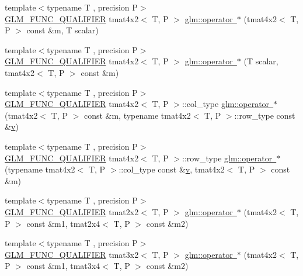 \begin{DoxyCompactItemize}
\item 
{\footnotesize template$<$typename T , precision P$>$ }\\\mbox{\hyperlink{setup_8hpp_a33fdea6f91c5f834105f7415e2a64407}{G\+L\+M\+\_\+\+F\+U\+N\+C\+\_\+\+Q\+U\+A\+L\+I\+F\+I\+ER}} tmat4x2$<$ T, P $>$ \mbox{\hyperlink{namespaceglm_a312fbcc303029e356741f9ebbd979899}{glm\+::operator $\ast$}} (tmat4x2$<$ T, P $>$ const \&m, T scalar)
\item 
{\footnotesize template$<$typename T , precision P$>$ }\\\mbox{\hyperlink{setup_8hpp_a33fdea6f91c5f834105f7415e2a64407}{G\+L\+M\+\_\+\+F\+U\+N\+C\+\_\+\+Q\+U\+A\+L\+I\+F\+I\+ER}} tmat4x2$<$ T, P $>$ \mbox{\hyperlink{namespaceglm_ae79f0b6ad6917a5a1a040a29983941f1}{glm\+::operator $\ast$}} (T scalar, tmat4x2$<$ T, P $>$ const \&m)
\item 
{\footnotesize template$<$typename T , precision P$>$ }\\\mbox{\hyperlink{setup_8hpp_a33fdea6f91c5f834105f7415e2a64407}{G\+L\+M\+\_\+\+F\+U\+N\+C\+\_\+\+Q\+U\+A\+L\+I\+F\+I\+ER}} tmat4x2$<$ T, P $>$\+::col\+\_\+type \mbox{\hyperlink{namespaceglm_ae9c993bec940fedbe4c463928c413cc4}{glm\+::operator $\ast$}} (tmat4x2$<$ T, P $>$ const \&m, typename tmat4x2$<$ T, P $>$\+::row\+\_\+type const \&\mbox{\hyperlink{glad_8h_a14cfbe2fc2234f5504618905b69d1e06}{v}})
\item 
{\footnotesize template$<$typename T , precision P$>$ }\\\mbox{\hyperlink{setup_8hpp_a33fdea6f91c5f834105f7415e2a64407}{G\+L\+M\+\_\+\+F\+U\+N\+C\+\_\+\+Q\+U\+A\+L\+I\+F\+I\+ER}} tmat4x2$<$ T, P $>$\+::row\+\_\+type \mbox{\hyperlink{namespaceglm_acd5258878cbff1f2e16ba4797c9b9e55}{glm\+::operator $\ast$}} (typename tmat4x2$<$ T, P $>$\+::col\+\_\+type const \&\mbox{\hyperlink{glad_8h_a14cfbe2fc2234f5504618905b69d1e06}{v}}, tmat4x2$<$ T, P $>$ const \&m)
\item 
{\footnotesize template$<$typename T , precision P$>$ }\\\mbox{\hyperlink{setup_8hpp_a33fdea6f91c5f834105f7415e2a64407}{G\+L\+M\+\_\+\+F\+U\+N\+C\+\_\+\+Q\+U\+A\+L\+I\+F\+I\+ER}} tmat2x2$<$ T, P $>$ \mbox{\hyperlink{namespaceglm_a43e3fa6486fd2cfc4bb092a5c50dd322}{glm\+::operator $\ast$}} (tmat4x2$<$ T, P $>$ const \&m1, tmat2x4$<$ T, P $>$ const \&m2)
\item 
{\footnotesize template$<$typename T , precision P$>$ }\\\mbox{\hyperlink{setup_8hpp_a33fdea6f91c5f834105f7415e2a64407}{G\+L\+M\+\_\+\+F\+U\+N\+C\+\_\+\+Q\+U\+A\+L\+I\+F\+I\+ER}} tmat3x2$<$ T, P $>$ \mbox{\hyperlink{namespaceglm_af70888c644dfdced45350c0c3fadebb6}{glm\+::operator $\ast$}} (tmat4x2$<$ T, P $>$ const \&m1, tmat3x4$<$ T, P $>$ const \&m2)

\end{DoxyCompactItemize}
